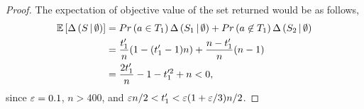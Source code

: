 \begin{proof}
The expectation of objective value of the set returned would be as follows,
\begin{align*}
  \mathbb{E} \left[ \Delta \left( S \, | \, \emptyset \right) \right] &= Pr \left( a \in T_1 \right) \Delta \left( S_1 \, | \, \emptyset \right)
  + Pr \left( a \not \in T_1 \right) \Delta \left( S_2 \, | \, \emptyset \right)\\
  & = \frac{t_1'}{n}(1 - (t_1'-1)n) + \frac{n-t_1'}{n}(n-1)\\
  &= \frac{2t_1'}{n}-1-t_1'^2+n < 0,
\end{align*}
since $\varepsilon = 0.1$, $n > 400$, and $\varepsilon n/2 < t_1' < \varepsilon(1+\varepsilon/3)n/2$.


\end{proof}

